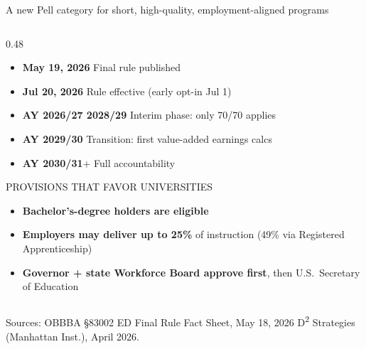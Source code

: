 \documentclass[aspectratio=169,11pt]{beamer}
\newcommand{\eyebrow}[1]{%
  {\sffamily\fontsize{7.5pt}{9pt}\selectfont
   \color{textMuted}%
   \MakeUppercase{#1}%
  }%
}
\newcommand{\monoLabel}[1]{%
  {\ttfamily\fontsize{7.5pt}{9pt}\selectfont\color{textMuted}#1}%
}
\begin{document}
\begin{frame}{A new Pell category for short, high-quality, employment-aligned programs}
\begin{columns}[T,onlytextwidth]
\begin{column}{0.48\textwidth}
\begin{itemize}
        \item \textbf{May 19, 2026} \textemdash{} Final rule published
        \item \textbf{Jul 20, 2026} \textemdash{} Rule effective
              ({\color{textMuted}early opt-in Jul 1})
        \item \textbf{AY 2026/27 \textendash{} 2028/29} \textemdash{} Interim phase: only 70/70 applies
        \item \textbf{AY 2029/30} \textemdash{} Transition: first value-added earnings calcs
        \item \textbf{AY 2030/31$+$} \textemdash{} Full accountability
      \end{itemize}
      \vspace{6pt}
      \eyebrow{provisions that favor universities}
      \vspace{2pt}
      \begin{itemize}\itemsep1pt
        \item \textbf{Bachelor's-degree holders are eligible}
        \item \textbf{Employers may deliver up to 25\%} of instruction
              ({\color{textMuted}49\% via Registered Apprenticeship})
        \item \textbf{Governor + state Workforce Board approve first}, then U.S.\ Secretary of Education
      \end{itemize}
    \end{column}
  \end{columns}
  \vspace{4pt}
  {\centering
   \monoLabel{Sources: OBBBA \S 83002 \textbullet{} ED Final Rule Fact Sheet, May 18, 2026 \textbullet{} D\textsuperscript{2} Strategies (Manhattan Inst.), April 2026.}\par}
\end{frame}
\end{document}
